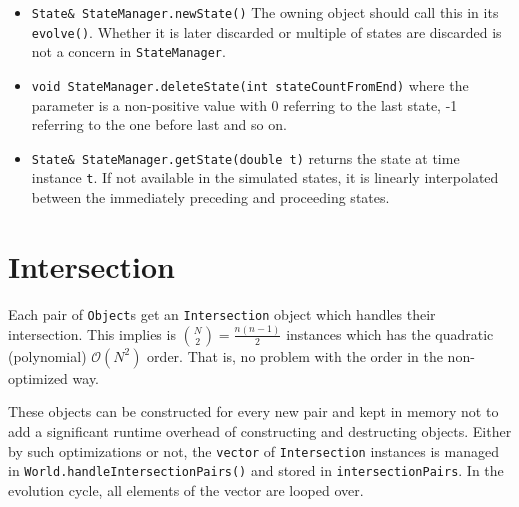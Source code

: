 \documentclass[a4paper]{report}
\begin{document}
\begin{itemize}
	\item \verb+State& StateManager.newState()+ The owning object should call this in its \verb+evolve()+. Whether it is later discarded or multiple of states are discarded is not a concern in \verb+StateManager+.
	\item \verb+void StateManager.deleteState(int stateCountFromEnd)+ where the parameter is a non-positive value with 0 referring to the last state, -1 referring to the one before last and so on.
\item \verb+State& StateManager.getState(double t)+ returns the state at time instance \verb+t+. If not available in the simulated states, it is linearly interpolated between the immediately preceding and proceeding states.
\end{itemize}

\chapter{Intersection}
\label{chap:intersection}
Each pair of \verb+Object+s get an \verb+Intersection+ object which handles their intersection.  This implies is $\binom{N}{2}=\frac{n(n-1)}{2}$ instances which has the quadratic (polynomial) $\mathcal{O}(N^2)$ order. That is, no problem with the order in the non-optimized way.

These objects can be constructed for every new pair and kept in memory not to add a significant runtime overhead of constructing and destructing objects. Either by such optimizations or not, the \verb+vector+ of \verb+Intersection+ instances is managed in \verb+World.handleIntersectionPairs()+ and stored in \verb+intersectionPairs+. In the evolution cycle, all elements of the vector are looped over. 
\end{document}
